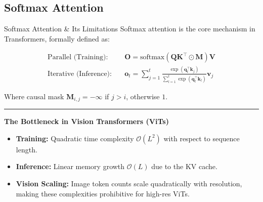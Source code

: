 \documentclass{beamer}
\begin{document}
\subsection{Softmax Attention}
\begin{frame}{Softmax Attention \& Its Limitations}
	Softmax attention is the core mechanism in Transformers, formally defined as:

	\vspace{-0.2cm}
	\begin{align*}
		\text{Parallel (Training)}: \quad   & \mathbf{O} = \text{softmax}(\mathbf{Q}\mathbf{K}^\top \odot \mathbf{M})\mathbf{V}                                                       \\
		\text{Iterative (Inference)}: \quad & \mathbf{o}_t = \sum_{j=1}^t \frac{\exp(\mathbf{q}_t^\top \mathbf{k}_j)}{\sum_{l=1}^t \exp(\mathbf{q}_t^\top \mathbf{k}_l)} \mathbf{v}_j
	\end{align*}
	\vspace{-0.4cm}

	{\footnotesize *Where causal mask $\mathbf{M}_{i,j} = -\infty$ if $j > i$, otherwise $1$.}

	\vspace{0.2cm}
	\hrule
	\vspace{0.3cm}

	\textbf{The Bottleneck in Vision Transformers (ViTs)}
	\begin{itemize}
		\item \textbf{Training:} Quadratic time complexity $\mathcal{O}(L^2)$ with respect to sequence length.
		\item \textbf{Inference:} Linear memory growth $\mathcal{O}(L)$ due to the KV cache.
		\item \textbf{Vision Scaling:} Image token counts scale quadratically with resolution, making these complexities prohibitive for high-res ViTs.
	\end{itemize}
\end{frame}
\end{document}
